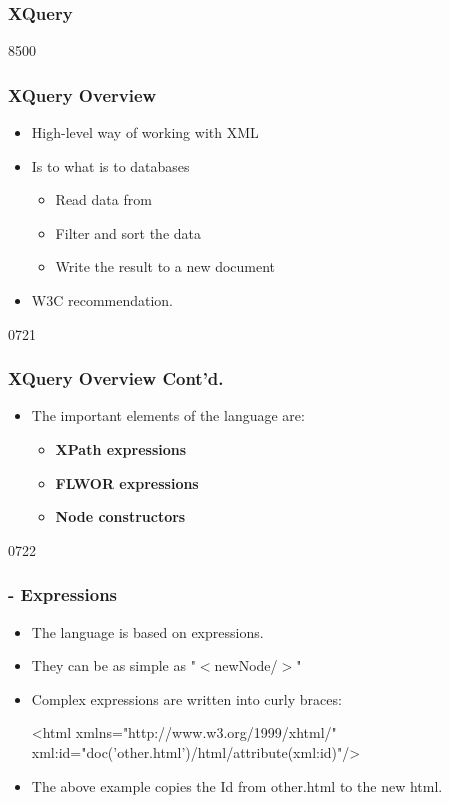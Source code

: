 \label{XQuery}
\subsubsection{XQuery}

\begin{slide}{8500}
\frametitle{XQuery Overview}
\begin{itemize}
\item High-level way of working with XML
\item Is to  what  is to databases
\begin{itemize}
\item Read data from 
\item Filter and sort the data
\item Write the result to a new  document
\end{itemize}
\item W3C recommendation.
\end{itemize}
\end{slide}



\begin{slide}[fragile]{0721}
\frametitle{XQuery Overview Cont'd.} \label{xquery-language}
\begin{itemize}
\item The important elements of the language are:
\begin{itemize}
\item \textbf{XPath expressions}
\item \textbf{FLWOR expressions}
\item \textbf{Node constructors}
\end{itemize}
\end{itemize}
\end{slide}


\begin{slide}[fragile]{0722}
\frametitle{ - Expressions}
\begin{itemize}
\item The language is based on expressions.
\item They can be as simple as "$<$newNode/$>$"
\item Complex expressions are written into curly braces:
\begin{xml}
 <html xmlns="http://www.w3.org/1999/xhtml/"
 xml:id="{doc('other.html')/html/attribute(xml:id)}"/> 
\end{xml}
\item The above example copies the  Id from other.html to the new html.
\end{itemize}
\end{slide}

